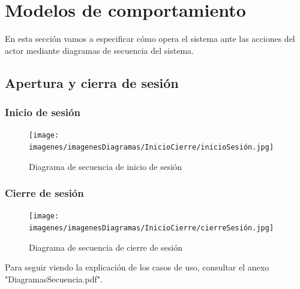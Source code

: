 \newpage


\section{Modelos de comportamiento}

En esta sección vamos a especificar cómo opera el sistema ante las acciones del actor mediante diagramas de secuencia del sistema. 

\subsection{Apertura y cierra de sesión}

\subsubsection{Inicio de sesión}

\begin{figure}[H]
	\centering
	\texttt{[image: imagenes/imagenesDiagramas/InicioCierre/inicioSesión.jpg]}
	\caption{Diagrama de secuencia de inicio de sesión}
	\label{fig:seqdiag1}
\end{figure}

\subsubsection{Cierre de sesión}

\begin{figure}[H]
	\centering
	\texttt{[image: imagenes/imagenesDiagramas/InicioCierre/cierreSesión.jpg]}
	\caption{Diagrama de secuencia de cierre de sesión}
	\label{fig:seqdiag2}
\end{figure}

Para seguir viendo la explicación de los casos de uso, consultar el anexo "DiagramasSecuencia.pdf".
